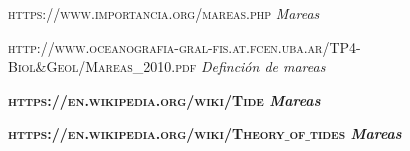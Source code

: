 \documentclass[12pt]{article}
\begin{document}
\begin{thebibliography}{9}

 \textsc{https://www.importancia.org/mareas.php} \textit{Mareas}

 \textsc{http://www.oceanografia-gral-fis.at.fcen.uba.ar/TP4-Biol\&Geol/Mareas\_2010.pdf} \textit{Definción de mareas}

\textbf{ \textsc{https://en.wikipedia.org/wiki/Tide} \textit{Mareas}
}

\textbf{ \textsc{https://en.wikipedia.org/wiki/Theory$\_$of$\_$tides} \textit{Mareas}
}

\end{thebibliography}
\end{document}

